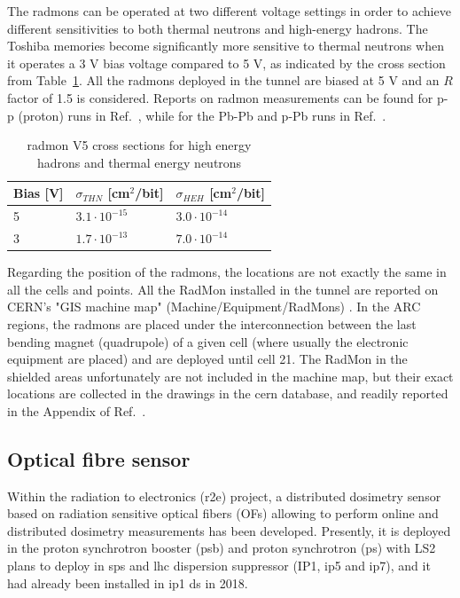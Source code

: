 \documentclass[encoding=utf8,british]{tumphthesis}
\begin{document}
The \acrshort{radmon}s can be operated at two different voltage settings in order to achieve different sensitivities to both thermal neutrons and high-energy hadrons. The Toshiba memories become significantly more sensitive to thermal neutrons when it operates a 3 V bias voltage compared to 5 V, as indicated by the cross section from Table~\ref{tab:RadMONV5-cross-sections}. All the \acrshort{radmon}s deployed in the tunnel are biased at 5 V and an $R$ factor of 1.5 is considered. Reports on \acrshort{radmon} measurements can be found for p-p (proton) runs in Ref.~\cite{Martinella:2647363}, while for the Pb-Pb and p-Pb runs in Ref.~\cite{Martinella:2652458}.


\begin{table}[t]
\caption{\acrshort{radmon} V5 cross sections for high energy hadrons and thermal energy neutrons}
\label{tab:RadMONV5-cross-sections}
\centering
\begin{tabular}{|l|l|l|}
\hline
Bias {[}V{]} & $\sigma_{THN}$ {[}cm$^2$/bit{]} & $\sigma_{HEH}$ {[}cm$^2$/bit{]} \\ \hline
5            & $3.1\cdot 10^{-15}$            & $3.0\cdot 10^{-14}$             \\ \hline
3            & $1.7\cdot 10^{-13}$            & $7.0\cdot 10^{-14}$             \\ \hline
\end{tabular}
\end{table}


Regarding the position of the \acrshort{radmon}s, the locations are not exactly the same in all the cells and points. All the RadMon installed in the tunnel are reported on CERN's "GIS machine map" (Machine/Equipment/RadMons) \cite{GIS:machine-map, GIS:website}. In the ARC regions, the \acrshort{radmon}s are placed under the interconnection between the last bending magnet (quadrupole) of a given cell (where usually the electronic equipment are placed) and are deployed until cell 21. The RadMon in the shielded areas unfortunately are not included in the machine map, but their exact locations are collected in the drawings in the \acrshort{cern} database, and readily reported in the Appendix of Ref.~\cite{Martinella:2647363}.



\subsection{Optical fibre sensor}


Within the radiation to electronics (\acrshort{r2e}) project, a distributed dosimetry sensor based on radiation sensitive optical fibers (OFs) allowing to perform online and distributed dosimetry measurements has been developed.
Presently, it is deployed in the proton synchrotron booster (\acrshort{psb}) \cite{DiFrancesca:2644042} and proton synchrotron (\acrshort{ps}) with LS2 plans to deploy in \acrshort{sps} and \acrshort{lhc} dispersion suppressor (IP1, \acrshort{ip}5 and \acrshort{ip}7), and it had already been installed in \acrshort{ip}1 \acrshort{ds} in 2018.
\end{document}
